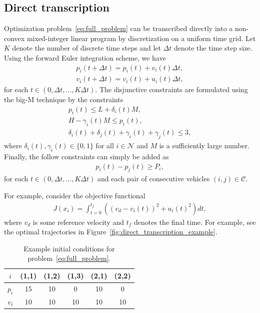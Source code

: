 \documentclass[a4paper]{article}
\theoremstyle{definition}
\theoremstyle{plain}
\begin{document}
\subsection*{Direct transcription}

Optimization problem~\eqref{eq:full_problem} can be transcribed directly into a
non-convex mixed-integer linear program by discretization on a uniform time
grid. Let $K$ denote the number of discrete time steps and let $\Delta t$ denote
the time step size.
%
Using the forward Euler integration scheme, we have
\begin{subequations}
\begin{align*}
  p_{i}(t + \Delta t) = p_{i}(t) + v_{i}(t) \Delta t , \\
  v_{i}(t + \Delta t) = v_{i}(t) + u_{i}(t) \Delta t ,
\end{align*}
\end{subequations}
for each $t \in (0, \Delta t, \dots, K \Delta t)$.
The disjunctive constraints are formulated using the big-M technique by the constraints
\begin{subequations}
\begin{align*}
  p_{i}(t) \leq L + \delta_{i}(t) M , \\
  H - \gamma_{i}(t) M \leq p_{i}(t) , \\
  \delta_{i}(t) + \delta_{j}(t) + \gamma_{i}(t) + \gamma_{j}(t) \leq 3 ,
\end{align*}
\end{subequations}
where $\delta_{i}(t), \gamma_{i}(t) \in \{ 0, 1 \}$ for all $i \in \mathcal{N}$
and $M$ is a sufficiently large number.
%
Finally, the follow constraints can simply be added as
\begin{align*}
  p_{i}(t) - p_{j}(t) \geq P_{i} ,
\end{align*}
for each $t \in (0, \Delta t, \dots, K \Delta t)$ and each pair of consecutive
vehicles $(i, j) \in \mathcal{C}$.

For example, consider the objective functional
\begin{align}\label{eq:example_obj}
  J(x_{i}) = \int_{t=0}^{t_{f}} \left( {(v_{d} - v_{i}(t))}^{2} + {u_{i}(t)}^{2} \right) dt ,
\end{align}
where $v_{d}$ is some reference velocity and $t_{f}$ denotes the final time. For
example, see the optimal trajectories in
Figure~\ref{fig:direct_transcription_example}.

\begin{table}[H]
  \centering
\begin{tabular}{ c | c c c | c c }
  $i$  & (1,1) & (1,2) & (1,3) & (2,1) & (2,2) \\
  \hline
  $p_{i}$ & 15 & 10 &  0 & 10 &  0 \\
  $v_{i}$ & 10 & 10 & 10 & 10 & 10 \\
\end{tabular}
\caption{Example initial conditions for problem~\eqref{eq:full_problem}.}
\label{tab:hult_parameters}
\end{table}
\end{document}

